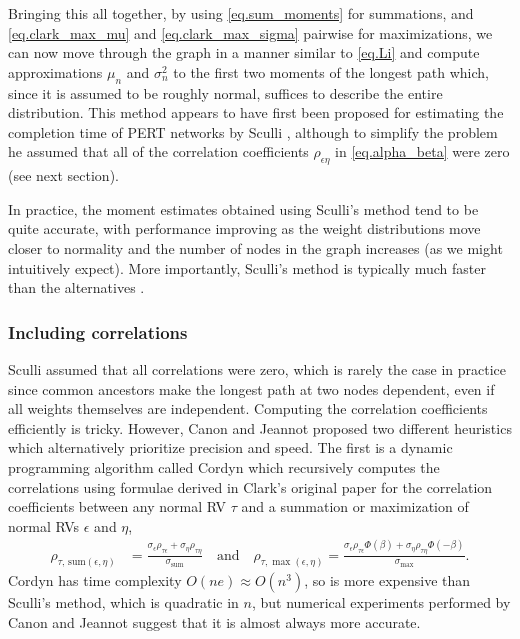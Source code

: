 \documentclass[12pt]{article}
\begin{document}
Bringing this all together, by using \eqref{eq.sum_moments} for summations, and \eqref{eq.clark_max_mu} and \eqref{eq.clark_max_sigma} pairwise for maximizations, we can now move through the graph in a manner similar to \eqref{eq.Li} and compute approximations $\mu_n$ and $\sigma_n^2$ to the first two moments of the longest path which, since it is assumed to be roughly normal, suffices to describe the entire distribution. This method appears to have first been proposed for estimating the completion time of PERT networks by Sculli \cite{scu83}, although to simplify the problem he assumed that all of the correlation coefficients $\rho_{\epsilon \eta}$ in \eqref{eq.alpha_beta} were zero (see next section).

In practice, the moment estimates obtained using Sculli's method tend to be quite accurate, with performance improving as the weight distributions move closer to normality and the number of nodes in the graph increases (as we might intuitively expect). More importantly, Sculli's method is typically much faster than the alternatives \cite{can16}. 

\subsubsection{Including correlations}
\label{subsubsect.correlation_aware}

Sculli assumed that all correlations were zero, which is rarely the case in practice since common ancestors make the longest path at two nodes dependent, even if all weights themselves are independent. Computing the correlation coefficients efficiently is tricky. However, Canon and Jeannot \cite{can16} proposed two different heuristics which alternatively prioritize precision and speed. The first is a dynamic programming algorithm called Cordyn which recursively computes the correlations using formulae derived in Clark's original paper for the correlation coefficients between any normal RV $\tau$ and a summation or maximization of normal RVs $\epsilon$ and $\eta$, 
\begin{align}
  \label{eq.clark_corrs}
  \rho_{\tau, \, \text{sum}(\epsilon, \eta)} &= \frac{\sigma_\epsilon \rho_{\tau \epsilon} + \sigma_\eta \rho_{\tau \eta} }{\sigma_{\text{sum}}} \quad \text{and} \quad
\rho_{\tau, \max(\epsilon, \eta)} = \frac{\sigma_\epsilon \rho_{\tau \epsilon} \Phi(\beta) + \sigma_\eta \rho_{\tau \eta} \Phi(-\beta)}{\sigma_{\max}}.
\end{align} 
Cordyn has time complexity $O(ne) \approx O(n^3)$, so is more expensive than Sculli's method, which is quadratic in $n$, but numerical experiments performed by Canon and Jeannot suggest that it is almost always more accurate. 
\end{document}
